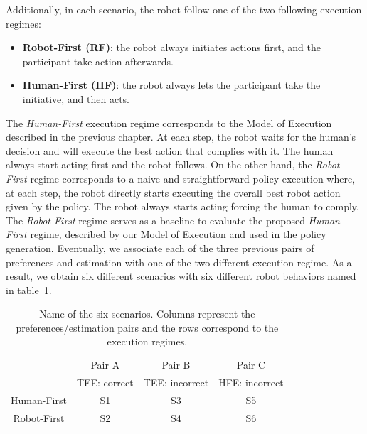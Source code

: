 Additionally, in each scenario, the robot follow one of the two following execution regimes:
\begin{itemize}
    \item \textbf{Robot-First (RF)}: the robot always initiates actions first, and the participant take action afterwards.
    \item \textbf{Human-First (HF)}: the robot always lets the participant take the initiative, and then acts.
\end{itemize}
The \textit{Human-First} execution regime corresponds to the Model of Execution described in the previous chapter. At each step, the robot waits for the human's decision and will execute the best action that complies with it. The human always start acting first and the robot follows. On the other hand, the \textit{Robot-First} regime corresponds to a naive and straightforward policy execution where, at each step, the robot directly starts executing the overall best robot action given by the policy. The robot always starts acting forcing the human to comply. The \textit{Robot-First} regime serves as a baseline to evaluate the proposed \textit{Human-First} regime, described by our Model of Execution and used in the policy generation.
Eventually, we associate each of the three previous pairs of preferences and estimation with one of the two different execution regime. As a result, we obtain six different scenarios with six different robot behaviors named in table~\ref{tab:scenario_names}.

\begin{table}
    \caption{Name of the six scenarios. 
    Columns represent the preferences/estimation pairs and the rows correspond to the execution regimes.}
    \begin{center}
    \begin{tabular}{c|c|c|c|}
        \cline{2-4}
                                                & Pair A        & Pair B            & Pair C\\
                                                & TEE: correct  & TEE: incorrect    & HFE: incorrect\\
        \hline
        \multicolumn{1}{|c|}{Human-First}       & S1            & S3                & S5\\
        \hline
        \multicolumn{1}{|c|}{Robot-First}       & S2            & S4                & S6\\
        \hline
    \end{tabular}
    \end{center}
    \label{tab:scenario_names}
\end{table}

